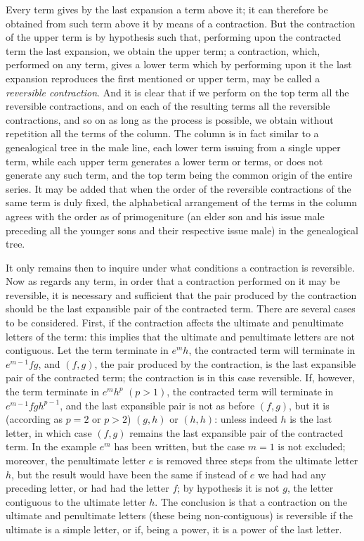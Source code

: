 \documentclass[11pt]{article}
\begin{document}
\noindent Every term gives by the last expansion a term above it; it can therefore be obtained from such term above it by means of a contraction. But the contraction of the upper term is by hypothesis such that, performing upon the contracted term the last expansion, we obtain the upper term; a contraction, which, performed on any term, gives a lower term which by performing upon it the last expansion reproduces the first mentioned or upper term, may be called a \textit{reversible contraction}. And it is clear that if we perform on the top term all the reversible contractions, and on each of the resulting terms all the reversible contractions, and so on as long as the process is possible, we obtain without repetition all the terms of the column. The column is in fact similar to a genealogical tree in the male line, each lower term issuing from a single upper term, while each upper term generates a lower term or terms, or does not generate any such term, and the top term being the common origin of the entire series. It may be added that when the order of the reversible contractions of the same term is duly fixed, the alphabetical arrangement of the terms in the column agrees with the order as of primogeniture (an elder son and his issue male preceding all the younger sons and their respective issue male) in the genealogical tree.

\medskip

\noindent It only remains then to inquire under what conditions a contraction is reversible. Now as regards any term, in order that a contraction performed on it may be reversible, it is necessary and sufficient that the pair produced by the contraction should be the last expansible pair of the contracted term. There are several cases to be considered. First, if the contraction affects the ultimate and penultimate letters of the term: this implies that the ultimate and penultimate letters are not contiguous. Let the term terminate in $e^m h$, the contracted term will terminate in $e^{m-1} f g$, and $(f, g)$, the pair produced by the contraction, is the last expansible pair of the contracted term; the contraction is in this case reversible. If, however, the term terminate in $e^m h^p$ $(p > 1)$, the contracted term will terminate in $e^{m-1} f g h^{p-1}$, and the last expansible pair is not as before $(f, g)$, but it is (according as $p = 2$ or $p > 2$) $(g, h)$ or $(h, h)$: unless indeed $h$ is the last letter, in which case $(f, g)$ remains the last expansible pair of the contracted term. In the example $e^m$ has been written, but the case $m = 1$ is not excluded; moreover, the penultimate letter $e$ is removed three steps from the ultimate letter $h$, but the result would have been the same if instead of $e$ we had had any preceding letter, or had had the letter $f$; by hypothesis it is not $g$, the letter contiguous to the ultimate letter $h$. The conclusion is that a contraction on the ultimate and penultimate letters (these being non-contiguous) is reversible if the ultimate is a simple letter, or if, being a power, it is a power of the last letter.
\end{document}
